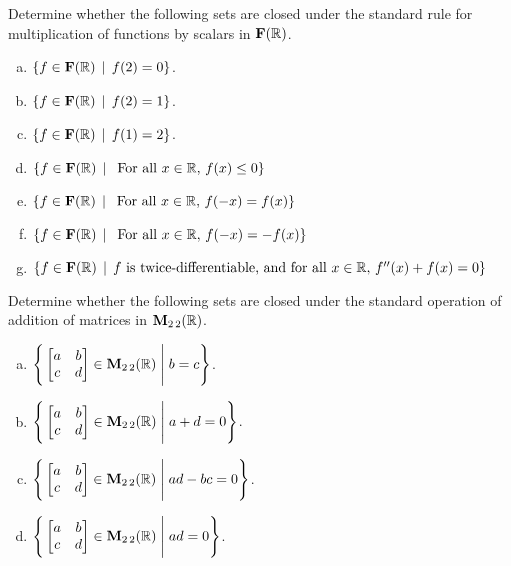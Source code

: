 \begin{prob}
\begin{enumerate}[a)]
\end{enumerate}

\end{prob} \begin{prob} \label{prob04.4} Determine whether the following sets are closed under the standard rule  for multiplication of functions  by scalars in $\mathbf{F}(\mathbb{R})$. 
\begin{enumerate}[a)]\medskip
\item  $\{f \in \mathbf{F}(\mathbb{R}) \,\mid \, f(2)=0  \}$.\medskip \medskip
%
\item\sov  $\{f \in \mathbf{F}(\mathbb{R}) \,\mid \, f(2)=1  \}$.\medskip \medskip
% 

\item  $\{f \in \mathbf{F}(\mathbb{R}) \,\mid \, f(1)=2  \}$.\medskip \medskip
%
\item\sov  $\{f \in \mathbf{F}(\mathbb{R}) \,\mid \, \text{ For all } x\in \mathbb{R},   \, f(x)\le 0 \}$\medskip 
%
\item  $\{f \in \mathbf{F}(\mathbb{R}) \,\mid \, \text{ For all } x\in \mathbb{R},   \, f(-x)= f(x) \}$\medskip 
%
\item\sov  $\{f \in \mathbf{F}(\mathbb{R}) \,\mid \, \text{ For all } x\in \mathbb{R},   \, f(-x)= -f(x) \}$\medskip 
%
 \item  $\{f \in \mathbf{F}(\mathbb{R})   \,\mid \, \text{$f$ is twice-differentiable, and  for all } x\in \mathbb{R},   \, f''(x)+ f(x)=0 \}$ \medskip  
%
\end{enumerate}


\end{prob} \begin{prob} \label{prob04.5} Determine whether the following sets are closed under the standard operation of addition of matrices in $\mathbf{M}_{2 \,2}(\mathbb{R})$. 
\begin{enumerate}[a)]\medskip


\item  $\Bigg\{  \bmatrix a&b\\ c&d\endbmatrix \in \M_{2 \,2}(\R) \;\Bigg|\; b=c\Bigg\}$.\medskip \medskip
%

\item\sov  $\Bigg\{  \bmatrix a&b\\ c&d\endbmatrix \in \M_{2 \,2}(\R) \;\Bigg|\; a+d=0\Bigg\}$. \medskip
%

\item  $\Bigg\{  \bmatrix a&b\\ c&d\endbmatrix \in \M_{2 \,2}(\R) \;\Bigg|\; ad-bc=0\Bigg\}$. \medskip
%


\item\sov  $\Bigg\{  \bmatrix a&b\\ c&d\endbmatrix \in \M_{2 \,2}(\R) \;\Bigg|\; ad=0\Bigg\}$.      \medskip
%


\end{enumerate}
\end{prob}
